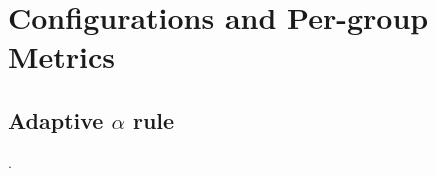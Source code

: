 \chapter{Configurations and Per-group Metrics}
\label{app:config}

\begin{table}[htbp]
  \caption{Configuration of the four cited runs, read from the  block of
  each . Values that the BPR-based modules take from the shared mode profile
  (local epochs, optimiser, loss, training negatives) are included.}
  \label{tab:hyperparams}
  \centering\small
  \fittable{}
\end{table}

\begin{table}[htbp]
  \caption{Full-population metrics of the four methods by user group at the best round.}
  \label{tab:main-groups}
  \centering\small
  \fittable{}
\end{table}

\section*{Adaptive $\alpha$ rule}
\label{app:alpha-rule}

.
